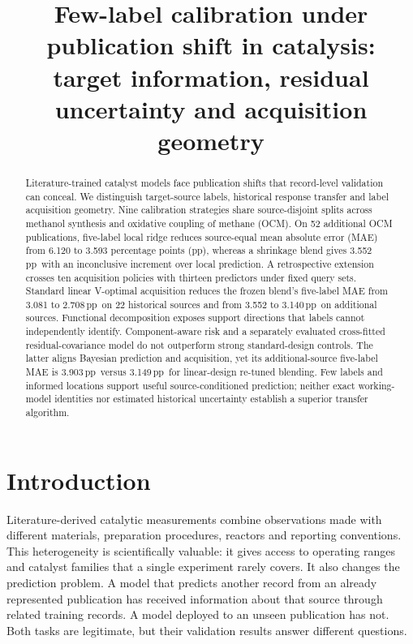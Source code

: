 \documentclass[11pt]{article}
\title{Few-label calibration under publication shift in catalysis:\\target information, residual uncertainty and acquisition geometry}
\author{}
\date{}
\newcommand{\pp}{\,pp}
\begin{document}
\maketitle
\begin{abstract}
Literature-trained catalyst models face publication shifts that record-level validation can conceal. We distinguish target-source labels, historical response transfer and label acquisition geometry. Nine calibration strategies share source-disjoint splits across methanol synthesis and oxidative coupling of methane (OCM). On 52 additional OCM publications, five-label local ridge reduces source-equal mean absolute error (MAE) from 6.120 to 3.593 percentage points (pp), whereas a shrinkage blend gives 3.552\pp\ with an inconclusive increment over local prediction. A retrospective extension crosses ten acquisition policies with thirteen predictors under fixed query sets. Standard linear V-optimal acquisition reduces the frozen blend's five-label MAE from 3.081 to 2.708\pp\ on 22 historical sources and from 3.552 to 3.140\pp\ on additional sources. Functional decomposition exposes support directions that labels cannot independently identify. Component-aware risk and a separately evaluated cross-fitted residual-covariance model do not outperform strong standard-design controls. The latter aligns Bayesian prediction and acquisition, yet its additional-source five-label MAE is 3.903\pp\ versus 3.149\pp\ for linear-design re-tuned blending. Few labels and informed locations support useful source-conditioned prediction; neither exact working-model identities nor estimated historical uncertainty establish a superior transfer algorithm.
\end{abstract}

\section{Introduction}
Literature-derived catalytic measurements combine observations made with different materials, preparation procedures, reactors and reporting conventions. This heterogeneity is scientifically valuable: it gives access to operating ranges and catalyst families that a single experiment rarely covers. It also changes the prediction problem. A model that predicts another record from an already represented publication has received information about that source through related training records. A model deployed to an unseen publication has not. Both tasks are legitimate, but their validation results answer different questions.
\end{document}
